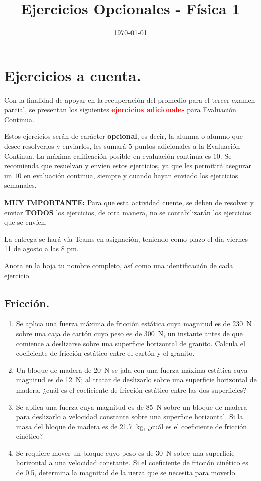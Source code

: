 \documentclass[14pt]{extarticle}
\title{\vspace*{-2cm} Ejercicios Opcionales - Física 1\vspace{-5ex}}
\date{\today}
\newcommand{\textocolor}[2]{\textbf{\textcolor{#1}{#2}}}
\begin{document}
\maketitle

\section{Ejercicios a cuenta.}

Con la finalidad de apoyar en la recuperación del promedio para el tercer examen parcial, se presentan los siguientes \textocolor{red}{ejercicios adicionales} para Evaluación Continua. 


Estos ejercicios serán de carácter \textocolor{cobalt}{opcional}, es decir, la alumna o alumno que desee resolverlos y enviarlos, les sumará $5$ puntos adicionales a la Evaluación Continua. La máxima calificación posible en evaluación continua es $10$. Se recomienda que resuelvan y envíen estos ejercicios, ya que les permitirá asegurar un $10$ en evaluación continua, siempre y cuando hayan enviado los ejercicios semanales.

\textbf{MUY IMPORTANTE:} Para que esta actividad cuente, se deben de resolver y enviar \textbf{TODOS} los ejercicios, de otra manera, no se contabilizarán los ejercicios que se envíen.

La entrega se hará vía Teams en asignación, teniendo como plazo el día viernes 11 de agosto a las 8 pm.

Anota en la hoja tu nombre completo, así como una identificación de cada ejercicio.

\subsection{Fricción.}

\begin{enumerate}
\item Se aplica una fuerza máxima de fricción estática cuya magnitud es de \SI{230}{\newton} sobre una caja de cartón cuyo peso es de \SI{300}{\newton}, un instante antes de que comience a deslizarse sobre una superficie horizontal de granito. Calcula el coeficiente de fricción estático entre el cartón y el granito.
\item Un bloque de madera de \SI{20}{\newton} se jala con una fuerza máxima estática cuya magnitud es de \SI{12}{\newton}; al tratar de deslizarlo sobre una superficie horizontal de madera, ¿cuál es el coeficiente de fricción estático entre las dos superficies?
\item Se aplica una fuerza cuya magnitud es de \SI{85}{\newton} sobre un bloque de madera para deslizarlo a velocidad constante sobre una superficie horizontal. Si la masa del bloque de madera es de \SI{21.7}{\kilo\gram}, ¿cuál es el coeficiente de fricción cinético?
\item Se requiere mover un bloque cuyo peso es de \SI{30}{\newton} sobre una superficie horizontal a una velocidad constante. Si el coeficiente de fricción cinético es de \num{0.5}, determina la magnitud de la uerza que se necesita para moverlo.
\end{enumerate}
\end{document}
